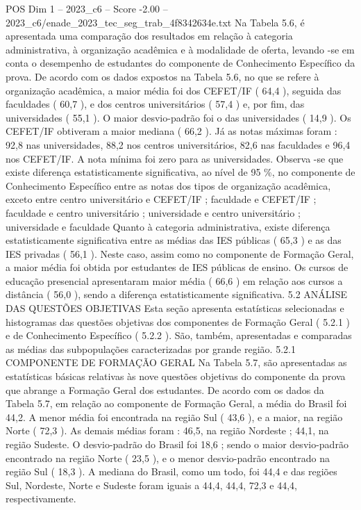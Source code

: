 \begin{textsample}{POS Dim 1 – 2023\_c6 – Score -2.00 – 2023\_c6/enade\_2023\_tec\_seg\_trab\_4f8342634e.txt}
Na Tabela 5.6, é apresentada uma comparação dos resultados em relação à categoria administrativa, à organização acadêmica e à modalidade de oferta, levando -se em conta o desempenho de estudantes do componente de Conhecimento Específico da prova.
De acordo com os dados expostos na Tabela 5.6, no que se refere à organização acadêmica, a maior média foi dos CEFET/IF ( 64,4 ), seguida das faculdades ( 60,7 ), e dos centros universitários ( 57,4 ) e, por fim, das universidades ( 55,1 ).
O maior desvio-padrão foi o das universidades ( 14,9 ).
Os CEFET/IF obtiveram a maior mediana ( 66,2 ).
Já as notas máximas foram : 92,8 nas universidades, 88,2 nos centros universitários, 82,6 nas faculdades e 96,4 nos CEFET/IF.
A nota mínima foi zero para as universidades.
Observa -se que existe diferença estatisticamente significativa, ao nível de 95 \%, no componente de Conhecimento Específico entre as notas dos tipos de organização acadêmica, exceto entre centro universitário e CEFET/IF ; faculdade e CEFET/IF ; faculdade e centro universitário ; universidade e centro universitário ; universidade e faculdade Quanto à categoria administrativa, existe diferença estatisticamente significativa entre as médias das IES públicas ( 65,3 ) e as das IES privadas ( 56,1 ).
Neste caso, assim como no componente de Formação Geral, a maior média foi obtida por estudantes de IES públicas de ensino.
Os cursos de educação presencial apresentaram maior média ( 66,6 ) em relação aos cursos a distância ( 56,0 ), sendo a diferença estatisticamente significativa. 5.2 ANÁLISE DAS QUESTÕES OBJETIVAS Esta seção apresenta estatísticas selecionadas e histogramas das questões objetivas dos componentes de Formação Geral ( 5.2.1 ) e de Conhecimento Específico ( 5.2.2 ).
São, também, apresentadas e comparadas as médias das subpopulações caracterizadas por grande região. 5.2.1 COMPONENTE DE FORMAÇÃO GERAL Na Tabela 5.7, são apresentadas as estatísticas básicas relativas às nove questões objetivas do componente da prova que abrange a Formação Geral dos estudantes.
De acordo com os dados da Tabela 5.7, em relação ao componente de Formação Geral, a média do Brasil foi 44,2.
A menor média foi encontrada na região Sul ( 43,6 ), e a maior, na região Norte ( 72,3 ).
As demais médias foram : 46,5, na região Nordeste ; 44,1, na região Sudeste.
O desvio-padrão do Brasil foi 18,6 ; sendo o maior desvio-padrão encontrado na região Norte ( 23,5 ), e o menor desvio-padrão encontrado na região Sul ( 18,3 ).
A mediana do Brasil, como um todo, foi 44,4 e das regiões Sul, Nordeste, Norte e Sudeste foram iguais a 44,4, 44,4, 72,3 e 44,4, respectivamente.

\end{textsample}

